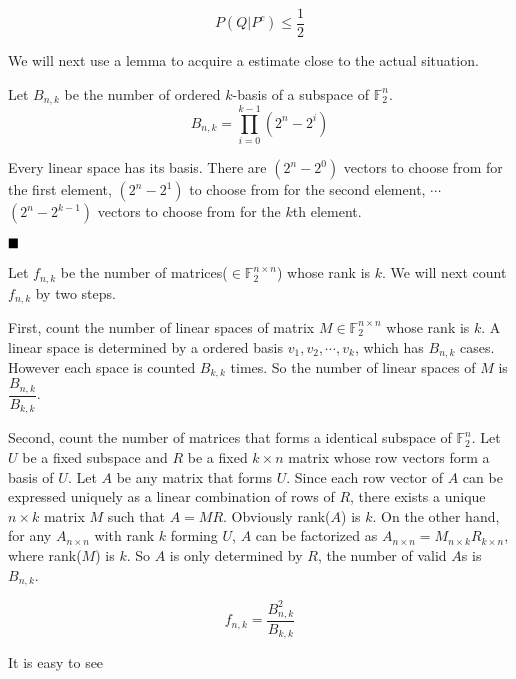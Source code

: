 \begin{prob} 
	\begin{equation}
		P(Q|P^c) \le \frac{1}{2}
	\end{equation}
	
	We will next use a lemma to acquire a estimate close to the actual situation. 
		
	\begin{lemma}
		Let $B_{n, k}$ be the number of ordered $k$-basis of a subspace of $\mathbb{F}_2^{n}$.\cite{7762210}
		\begin{equation*}
			B_{n, k} = \prod\limits_{i = 0}^{k - 1} (2 ^ n - 2 ^ i)
		\end{equation*}
	\end{lemma}

	\proof
	
	Every linear space has its basis. There are $(2 ^ n - 2 ^ 0)$ vectors to choose from for the first element, $(2 ^ n - 2 ^ 1)$ to choose from for the second element, $\cdots$ $(2 ^ n - 2 ^ {k - 1})$ vectors to choose from for the $k$th element.
	
	$\hfill\blacksquare$ 
	
	Let $f_{n, k}$ be the number of matrices($\in \mathbb{F}_2^{n \times n}$) whose rank is $k$. We will next count $f_{n, k}$ by two steps.
	
	First, count the number of linear spaces of matrix $M \in \mathbb{F}_2^{n \times n}$ whose rank is $k$. A linear space is determined by a ordered basis $v_1, v_2, \cdots, v_k$, which has $B_{n, k}$ cases. However each space is counted $B_{k, k}$ times. So the number of linear spaces of $M$ is $\dfrac{B_{n, k}}{B_{k, k}}$.
	
	Second, count the number of matrices that forms a identical subspace of $\mathbb{F}_2^n$. Let $U$ be a fixed subspace and $R$ be a fixed $k \times n$ matrix whose row vectors form a basis of $U$. Let $A$ be any matrix that forms $U$. Since each row vector of $A$ can be expressed uniquely as a linear combination of rows of $R$, there exists a unique $n \times k$ matrix $M$ such that $A = MR$. Obviously rank($A$) is $k$. On the other hand, for any $A_{n \times n}$ with rank $k$ forming $U$, $A$ can be factorized as $A_{n \times n} = M_{n \times k}R_{k \times n}$, where rank($M$) is $k$. So $A$ is only determined by $R$, the number of valid $A$s is $B_{n, k}$.
	
	\begin{equation*}
		f_{n, k} = \dfrac{B_{n, k} ^ 2}{B_{k, k}}
	\end{equation*}
	
	It is easy to see 
	

\end{prob}
